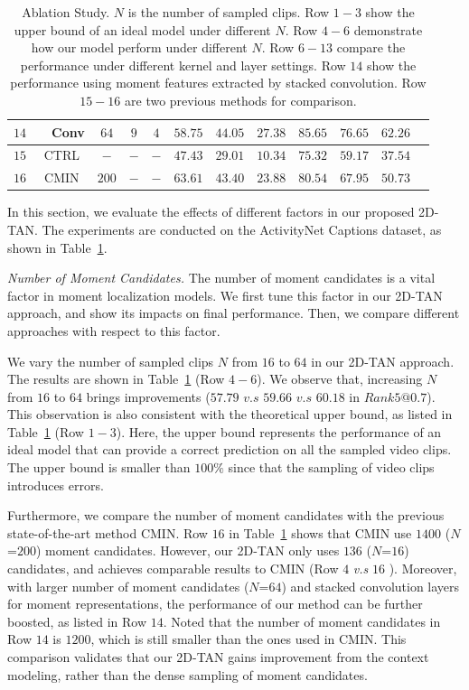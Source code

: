 \documentclass[letterpaper]{article} %
\begin{document}
\begin{table}[t]
\begin{center}
\begin{tabular}{|c|c|c|c|c|c|c|c|c|c|c|c|c|}
$14$ & & Conv &$64$ & $9$ & $4$  & $58.75$ & ${44.05}$ & ${27.38}$ & ${85.65}$ & ${76.65}$ & ${62.26}$\\
\hline
\hline
$15$ & \multicolumn{2}{c|}{CTRL} & $-$ & $-$ & $-$ & $47.43$ & $29.01$ & $10.34$ & $75.32$ & $59.17$ & $37.54$  \\
$16$ & \multicolumn{2}{c|}{CMIN} & $200$ & $-$ & $-$ & $63.61$ & $43.40$ & $23.88$ & $80.54$ & $67.95$ & $50.73$\\
\hline
\end{tabular}
\end{center}
\caption{Ablation Study.
$N$ is the number of sampled clips.
Row $1-3$ show the upper bound of an ideal model under different $N$.
Row $4-6$ demonstrate how our model perform under different $N$.
Row $6-13$ compare the performance under different kernel and layer settings.
Row $14$ show the performance using moment features  extracted by stacked convolution.
Row $15-16$ are two previous methods for comparison.
}
\label{tab:ablation_study}
\end{table}

In this section, we evaluate the effects of different factors in our proposed 2D-TAN.
The experiments are conducted on the ActivityNet Captions dataset, as shown in Table~\ref{tab:ablation_study}.

\textit{Number of Moment Candidates. }
The number of moment candidates is a vital factor in moment localization models.
We first tune this factor in our 2D-TAN approach, and show its impacts on final performance. Then, we compare different approaches with respect to this factor.


We vary the number of sampled clips $N$ from $16$ to $64$ in our 2D-TAN approach. The results are shown in Table~\ref{tab:ablation_study} (Row $4-6$). We observe that, increasing $N$ from $16$ to $64$ brings  improvements ($57.79$ $v.s$ $59.66$ $v.s$ $60.18$ in $Rank5@0.7$). This observation is also consistent with the theoretical upper bound, as listed in Table~\ref{tab:ablation_study} (Row $1-3$). Here, the upper bound represents the performance of an ideal model that can provide a correct prediction on all the sampled video clips. The upper bound is smaller than $100\%$ since that the sampling of video clips introduces errors.


Furthermore, we compare the number of moment candidates with the previous state-of-the-art method CMIN.
Row $16$ in Table~\ref{tab:ablation_study} shows that CMIN use $1400$ ($N$=$200$) moment candidates. However, our 2D-TAN only uses $136$ ($N$=$16$) candidates, and achieves comparable results to CMIN (Row $4$ \emph{v.s} $16$ ).
Moreover, with larger number of moment candidates ($N$=$64$) and stacked convolution layers for moment representations, the performance of our method can be further boosted, as listed in Row $14$.
Noted that the number of moment candidates in Row $14$ is $1200$, which is still smaller than the ones used in CMIN.
This comparison validates that our 2D-TAN gains improvement from the context modeling, rather than the dense sampling of moment candidates.
\end{document}
